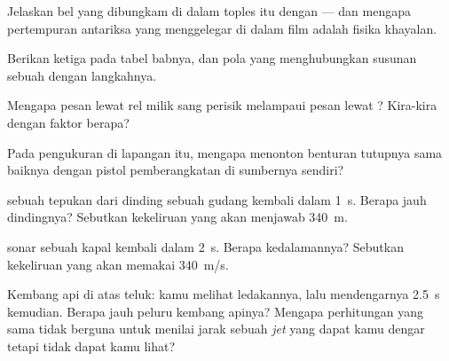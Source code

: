 \begin{exercise}[$\star$]\label{exo:g7:sound-production:3}
Jelaskan bel yang dibungkam di dalam toples itu dengan  --- dan
mengapa pertempuran antariksa yang menggelegar di dalam film adalah
fisika khayalan.
\end{exercise}

\begin{exercise}[$\star$]\label{exo:g7:sound-production:4}
Berikan ketiga  pada tabel babnya, dan pola yang menghubungkan
susunan  sebuah  dengan langkahnya.
\end{exercise}

\begin{exercise}[$\star$]\label{exo:g7:sound-production:5}
Mengapa pesan lewat rel milik sang perisik melampaui pesan lewat
? Kira-kira dengan faktor berapa?
\end{exercise}

\begin{exercise}[$\star$]\label{exo:g7:sound-production:6}
Pada pengukuran di lapangan itu, mengapa menonton benturan tutupnya
sama baiknya dengan pistol pemberangkatan di sumbernya sendiri?
\end{exercise}

\begin{exercise}[$\star$]\label{exo:g7:sound-production:7}
 sebuah tepukan dari dinding sebuah gudang kembali dalam
\qty{1}{s}. Berapa jauh dindingnya? Sebutkan kekeliruan yang akan
menjawab \qty{340}{m}.
\end{exercise}

\begin{exercise}[$\star$]\label{exo:g7:sound-production:8}
 sonar sebuah kapal kembali dalam \qty{2}{s}. Berapa kedalamannya?
Sebutkan kekeliruan yang akan memakai \qty{340}{m/s}.
\end{exercise}

\begin{exercise}[$\star\star$]\label{exo:g7:sound-production:9}
Kembang api di atas teluk: kamu melihat ledakannya, lalu mendengarnya
\qty{2.5}{s} kemudian. Berapa jauh peluru kembang apinya? Mengapa
perhitungan yang sama tidak berguna untuk menilai jarak sebuah
\emph{jet} yang dapat kamu dengar tetapi tidak dapat kamu lihat?
\end{exercise}

